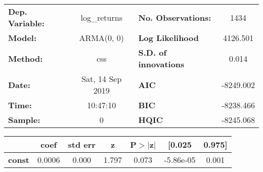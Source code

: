 \begin{center}
\begin{tabular}{lclc}
\toprule
\textbf{Dep. Variable:} &   log\_returns   & \textbf{  No. Observations:  } &    1434     \\
\textbf{Model:}         &    ARMA(0, 0)    & \textbf{  Log Likelihood     } &  4126.501   \\
\textbf{Method:}        &       css        & \textbf{  S.D. of innovations} &   0.014     \\
\textbf{Date:}          & Sat, 14 Sep 2019 & \textbf{  AIC                } & -8249.002   \\
\textbf{Time:}          &     10:47:10     & \textbf{  BIC                } & -8238.466   \\
\textbf{Sample:}        &        0         & \textbf{  HQIC               } & -8245.068   \\
\bottomrule
\end{tabular}
\begin{tabular}{lcccccc}
               & \textbf{coef} & \textbf{std err} & \textbf{z} & \textbf{P$> |$z$|$} & \textbf{[0.025} & \textbf{0.975]}  \\
\midrule
\textbf{const} &       0.0006  &        0.000     &     1.797  &         0.073        &    -5.86e-05    &        0.001     \\
\bottomrule
\end{tabular}
\end{center}
